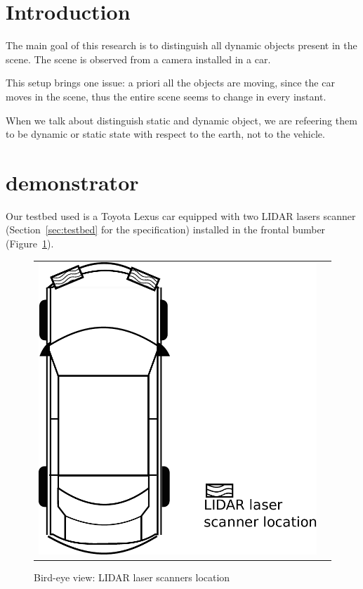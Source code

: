 
\section{Introduction}

The main goal of this research is to distinguish all dynamic objects present in the scene. The scene is observed from a camera installed in a car.

This setup brings one issue: a priori all the objects are moving, since the car moves in the scene, thus the entire scene seems to change in every instant. 

When we talk about distinguish static and dynamic object, we are refeering them to be dynamic or static state with respect to the earth, not to the vehicle.

\section{demonstrator} %
\label{sec:demonstrator}

Our testbed used is a Toyota Lexus car equipped with two LIDAR lasers scanner (Section~\ref{sec:testbed} for the specification) installed in the frontal bumber (Figure~\ref{fig:demonstrator:birdeye}).

\begin{figure}[h]
   \centering
     \begin{tabular}{lr}
       \includegraphics[scale=0.4]{img/fig:demonstrator:birdeye}
     \end{tabular}
   \caption{Bird-eye view: LIDAR laser scanners location}
   \label{fig:demonstrator:birdeye}
\end{figure}

